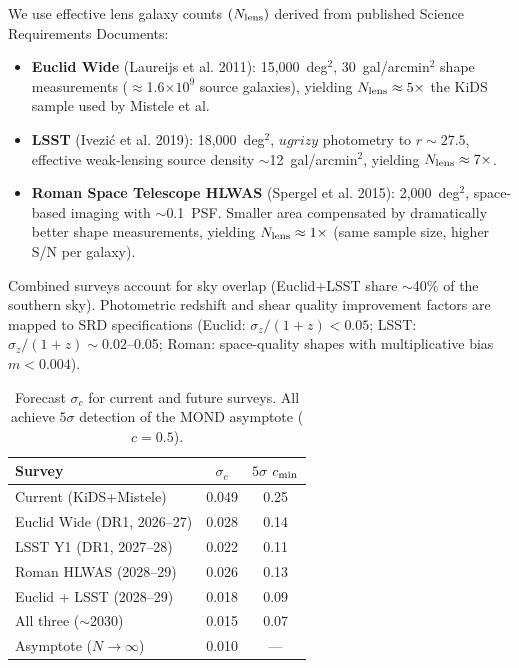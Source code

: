 \documentclass[twocolumn]{aastex631}
\begin{document}
We use effective lens galaxy counts $(N_{\rm lens})$ derived from
published Science Requirements Documents:

\begin{itemize}
\item \textbf{Euclid Wide} (Laureijs et al. 2011): 15,000~deg$^2$,
      30~gal/arcmin$^2$ shape measurements ($\approx$1.6$\times10^9$
      source galaxies), yielding $N_{\rm lens} \approx 5\times$ the KiDS
      sample used by Mistele et al.
\item \textbf{LSST} (Ivezi\'c et al. 2019): 18,000~deg$^2$, $ugrizy$
      photometry to $r \sim 27.5$, effective weak-lensing source density
      $\sim$12~gal/arcmin$^2$, yielding $N_{\rm lens} \approx 7\times$.
\item \textbf{Roman Space Telescope HLWAS} (Spergel et al. 2015):
      2,000~deg$^2$, space-based imaging with $\sim$0.1\arcsec\ PSF.
      Smaller area compensated by dramatically better shape measurements,
      yielding $N_{\rm lens} \approx 1\times$ (same sample size, higher
      S/N per galaxy).
\end{itemize}

Combined surveys account for sky overlap (Euclid+LSST share $\sim$40\%
of the southern sky).  Photometric redshift and shear quality improvement
factors are mapped to SRD specifications (Euclid: $\sigma_z/(1+z) <
0.05$; LSST: $\sigma_z/(1+z) \sim 0.02$--0.05; Roman: space-quality
shapes with multiplicative bias $m < 0.004$).

\begin{table}
\centering
\caption{Forecast $\sigma_c$ for current and future surveys.  All
achieve $5\sigma$ detection of the MOND asymptote ($c=0.5$).}
\begin{tabular}{lcc}
\hline
Survey                     & $\sigma_c$      & $5\sigma$ $c_{\rm min}$ \\
\hline
Current (KiDS+Mistele)     & 0.049           & 0.25 \\
Euclid Wide (DR1, 2026--27)         & 0.028           & 0.14 \\
LSST Y1 (DR1, 2027--28)            & 0.022           & 0.11 \\
Roman HLWAS (2028--29)         & 0.026           & 0.13 \\
Euclid + LSST (2028--29)       & 0.018           & 0.09 \\
All three ($\sim$2030)           & 0.015           & 0.07 \\
\hline
Asymptote ($N\to\infty$)   & 0.010           & --- \\
\hline
\end{tabular}
\label{tab:forecast}
\end{table}
\end{document}
